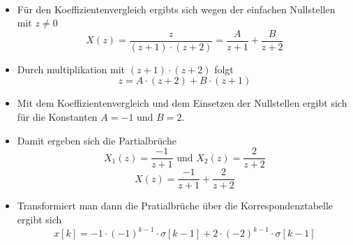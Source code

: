 \documentclass[11pt]{article}
\providecommand{\tightlist}{%
      \setlength{\itemsep}{0pt}\setlength{\parskip}{0pt}}
\begin{document}
    \begin{center}
    \end{center}
    { \hspace*{\fill} \\}
    
    \begin{itemize}
\tightlist
\item
  Für den Koeffizientenvergleich ergibts sich wegen der einfachen
  Nullstellen mit \(z \neq 0\)
  \[X(z) = \frac{z}{(z+1) \cdot (z+2)} = \frac{A}{z+1} + \frac{B}{z+2}\]
\end{itemize}

    \begin{itemize}
\tightlist
\item
  Durch multiplikation mit \((z+1) \cdot (z+2)\) folgt
  \[ z = A \cdot (z+2) + B \cdot (z+1)\]
\end{itemize}

    \begin{itemize}
\tightlist
\item
  Mit dem Koeffizientenvergleich und dem Einsetzen der Nullstellen
  ergibt sich für die Konstanten \(A = -1\) und \(B = 2\).
\end{itemize}

    \begin{itemize}
\tightlist
\item
  Damit ergeben sich die Partialbrüche
  \[ X_1(z) = \frac{-1}{z+1} \textrm{  und  } X_2(z) = \frac{2}{z+2}\]
  \[ X(z) = \frac{-1}{z+1} + \frac{2}{z+2}\]
\end{itemize}

    \begin{itemize}
\tightlist
\item
  Transformiert man dann die Pratialbrüche über die Korrespondenztabelle
  ergibt sich
  \[x[k] = -1 \cdot (-1)^{k-1} \cdot \sigma[k-1] + 2 \cdot (-2)^{k-1} \cdot \sigma[k-1]\]
\end{itemize}
\end{document}
